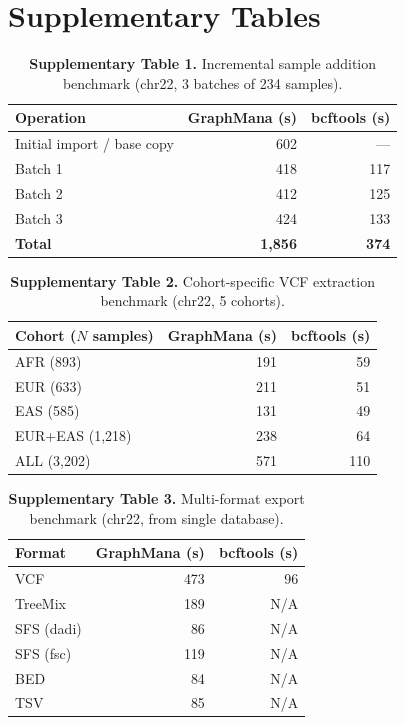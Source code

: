 \documentclass[11pt,a4paper]{article}
\begin{document}
\newpage


\section{Supplementary Tables}

\begin{table}[h]
\caption{\textbf{Supplementary Table 1.} Incremental sample addition benchmark (chr22, 3 batches of 234 samples).}
\begin{tabular}{@{}lrr@{}}
\toprule
Operation & GraphMana (s) & bcftools (s) \\
\midrule
Initial import / base copy & 602 & --- \\
Batch 1 & 418 & 117 \\
Batch 2 & 412 & 125 \\
Batch 3 & 424 & 133 \\
\textbf{Total} & \textbf{1,856} & \textbf{374} \\
\bottomrule
\end{tabular}
\end{table}

\begin{table}[h]
\caption{\textbf{Supplementary Table 2.} Cohort-specific VCF extraction benchmark (chr22, 5 cohorts).}
\begin{tabular}{@{}lrr@{}}
\toprule
Cohort ($N$ samples) & GraphMana (s) & bcftools (s) \\
\midrule
AFR (893) & 191 & 59 \\
EUR (633) & 211 & 51 \\
EAS (585) & 131 & 49 \\
EUR+EAS (1,218) & 238 & 64 \\
ALL (3,202) & 571 & 110 \\
\bottomrule
\end{tabular}
\end{table}

\begin{table}[h]
\caption{\textbf{Supplementary Table 3.} Multi-format export benchmark (chr22, from single database).}
\begin{tabular}{@{}lrr@{}}
\toprule
Format & GraphMana (s) & bcftools (s) \\
\midrule
VCF & 473 & 96 \\
TreeMix & 189 & N/A \\
SFS (dadi) & 86 & N/A \\
SFS (fsc) & 119 & N/A \\
BED & 84 & N/A \\
TSV & 85 & N/A \\
\bottomrule
\end{tabular}
\end{table}
\end{document}

